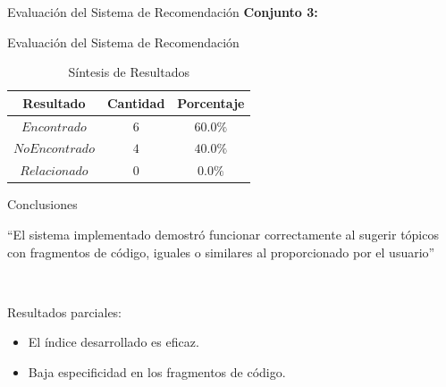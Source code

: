 \documentclass{beamer}
\begin{document}
\begin{frame}{Evaluación del Sistema de Recomendación}
\textbf{Conjunto 3:}
\begin{table}[h]
\caption{Resultados generales.}
\centering
{}
\end{table}
\end{frame}

\begin{frame}{Evaluación del Sistema de Recomendación}
\begin{table}[H]
\caption{Síntesis de Resultados}
\centering
\begin{tabular}{ccc}
\hline
{Resultado} & {Cantidad} & {Porcentaje} \\
\hline
$Encontrado$ & $6$ & $60.0\%$ \\
$No Encontrado$ & $4$ & $40.0\%$ \\
$Relacionado$ & $0$ & $0.0\%$ \\
\hline
\end{tabular}
\end{table}
\end{frame}

\begin{frame}{Conclusiones}
\begin{center}
``El sistema implementado demostró funcionar correctamente al sugerir tópicos con
fragmentos de código, iguales o similares al proporcionado por el usuario''
\end{center}
~

Resultados parciales:
\begin{itemize}
  \item El índice desarrollado es eficaz.
  \item Baja especificidad en los fragmentos de código.
\end{itemize}
\end{frame}
\end{document}
